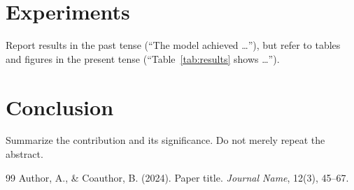 
\section{Experiments}
\label{sec:exp}

Report results in the past tense (``The model achieved \ldots''), but refer to tables and figures in the present tense (``Table~\ref{tab:results} shows \ldots'').

\section{Conclusion}
\label{sec:conclusion}

Summarize the contribution and its significance. Do not merely repeat the abstract.


% 
% 

\begin{thebibliography}{99}
  Author, A., \& Coauthor, B. (2024). Paper title. \emph{Journal Name}, 12(3), 45--67.
\end{thebibliography}



